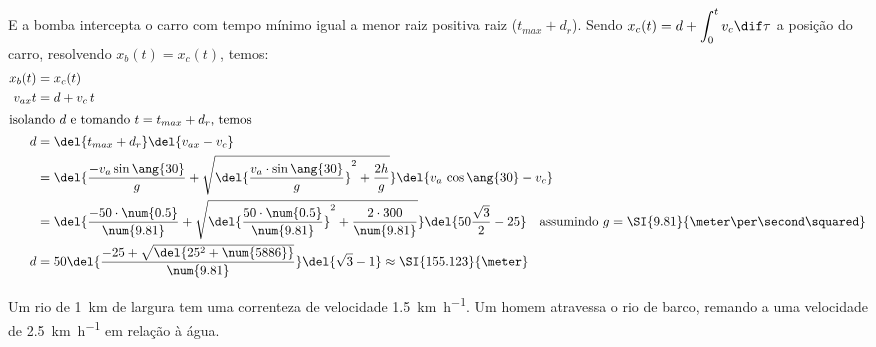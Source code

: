 \documentclass[]{IMTexam}
\begin{document}
\begin{questions}
\begin{solution}
		E a bomba intercepta o carro com tempo mínimo igual a menor raiz positiva raiz ($ t_{max}+ d_r $).
		Sendo $ x_c(t)=d+\displaystyle\int_{0}^{t}v_c\dif\tau $ a posição do carro, resolvendo $ x_b(t)=x_c(t) $, temos:
		\begin{align*}
			x_b(t)  & =x_c(t)                                                                                                                                                                                                                    \\
			v_{ax}t & =d+v_c\,t                                                                                                                                                                                                                  \\
			\intertext{isolando $ d $ e tomando $ t=t_{max}+ d_r $, temos}
			d       & =\del{t_{max}+ d_r}\del{v_{ax}-v_c}                                                                                                                                                                                        \\
			        & =\del{\dfrac{-v_{a}\sin\ang{30}}{g}+\sqrt{\del{\dfrac{v_{a}\cdot\sin\ang{30}}{g}}^{2}+\dfrac{2h}{g}}}\del{v_{a}\,\cos\ang{30}-v_c}                                                                                         \\
			        & =\del{\dfrac{-50\cdot\num{0.5}}{\num{9.81}}+\sqrt{\del{\dfrac{50\cdot\num{0.5}}{\num{9.81}}}^{2}+\dfrac{2\cdot300}{\num{9.81}}}}\del{50\dfrac{\sqrt{3}}{2}-25}\quad\text{assumindo }g=\SI{9.81}{\meter\per\second\squared} \\
			d       & =50\del{\dfrac{-25+\sqrt{\del{25^{2}+\num{5886}}}}{\num{9.81}}}\del{\sqrt{3}-1}\approx\SI{155.123}{\meter}
		\end{align*}
	\end{solution}

	\clearpage

	\question
	Um rio de \SI{1}{\kilo\meter} de largura tem uma correnteza de velocidade \SI{1.5}{\kilo\meter\per\hour}. Um homem atravessa o rio de barco, remando a uma velocidade de \SI{2.5}{\kilo\meter\per\hour} em relação à água.

\end{questions}
\end{document}
